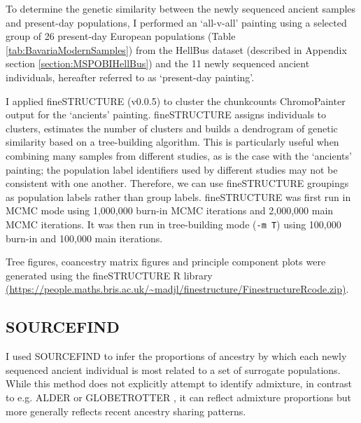 To determine the genetic similarity between the newly sequenced ancient samples and present-day populations, I performed an `all-v-all' painting using a selected group of 26 present-day European populations (Table \ref{tab:BavariaModernSamples}) from the HellBus dataset (described in Appendix section \ref{section:MSPOBIHellBus}) and the 11 newly sequenced ancient individuals, hereafter referred to as `present-day painting'.

I applied fineSTRUCTURE (v0.0.5)\cite{Lawson2012} to cluster the chunkcounts ChromoPainter output for the `ancients' painting. fineSTRUCTURE assigns individuals to clusters, estimates the  number of clusters and builds a dendrogram of genetic similarity based on a tree-building algorithm. This is particularly useful when combining many samples from different studies, as is the case with the `ancients' painting; the population label identifiers used by different studies may not be consistent with one another. Therefore, we can use fineSTRUCTURE groupings as population labels rather than group labels. fineSTRUCTURE was first run in MCMC mode using 1,000,000 burn-in MCMC iterations and 2,000,000 main MCMC iterations. It was then run in tree-building mode (\texttt{-m T}) using 100,000 burn-in and 100,000 main iterations. 

Tree figures, coancestry matrix figures and principle component plots were generated using the fineSTRUCTURE R library \url{(https://people.maths.bris.ac.uk/~madjl/finestructure/FinestructureRcode.zip)}.

\subsection{SOURCEFIND} \label{sec:ch4_SOURCEFIND}

I used SOURCEFIND \cite{Chacon-Duque2018} to infer the proportions of ancestry by which each newly sequenced ancient individual is most related to a set of surrogate populations. While this method does not explicitly attempt to identify admixture, in contrast to e.g. ALDER \cite{LohAlderAdmixture} or GLOBETROTTER \cite{Hellenthal2014}, it can reflect admixture proportions \cite{Chacon-Duque2018} but more generally reflects recent ancestry sharing patterns.

